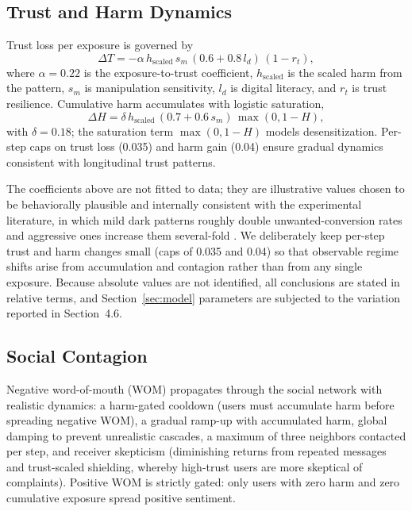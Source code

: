 \documentclass[a4paper]{article}
\begin{document}
\subsection{Trust and Harm Dynamics}
Trust loss per exposure is governed by
\begin{equation}
\Delta T = -\alpha \, h_{\text{scaled}} \, s_m \, (0.6 + 0.8\,l_d)\,(1 - r_t),
\end{equation}
where $\alpha = 0.22$ is the exposure-to-trust coefficient, $h_{\text{scaled}}$ is the scaled harm from the pattern, $s_m$ is manipulation sensitivity, $l_d$ is digital literacy, and $r_t$ is trust resilience. Cumulative harm accumulates with logistic saturation,
\begin{equation}
\Delta H = \delta \, h_{\text{scaled}} \, (0.7 + 0.6\,s_m)\,\max(0, 1 - H),
\end{equation}
with $\delta = 0.18$; the saturation term $\max(0, 1-H)$ models desensitization. Per-step caps on trust loss (0.035) and harm gain (0.04) ensure gradual dynamics consistent with longitudinal trust patterns.

The coefficients above are not fitted to data; they are illustrative values chosen to be behaviorally plausible and internally consistent with the experimental literature, in which mild dark patterns roughly double unwanted-conversion rates and aggressive ones increase them several-fold \citep{luguri2021}. We deliberately keep per-step trust and harm changes small (caps of 0.035 and 0.04) so that observable regime shifts arise from accumulation and contagion rather than from any single exposure. Because absolute values are not identified, all conclusions are stated in relative terms, and Section~\ref{sec:model} parameters are subjected to the variation reported in Section~4.6.

\subsection{Social Contagion}
Negative word-of-mouth (WOM) propagates through the social network with realistic dynamics: a harm-gated cooldown (users must accumulate harm before spreading negative WOM), a gradual ramp-up with accumulated harm, global damping to prevent unrealistic cascades, a maximum of three neighbors contacted per step, and receiver skepticism (diminishing returns from repeated messages and trust-scaled shielding, whereby high-trust users are more skeptical of complaints). Positive WOM is strictly gated: only users with zero harm and zero cumulative exposure spread positive sentiment.
\end{document}
